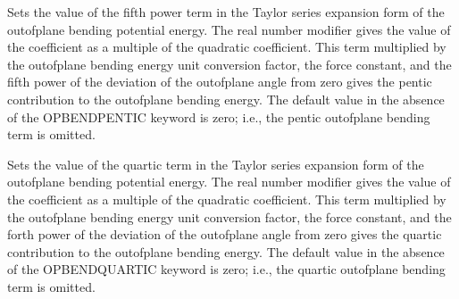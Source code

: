 \documentclass[letterpaper,11pt,english]{sphinxmanual}
\begin{document}
\ignorespaces {}\label{\detokenize{text/keywords:key-opbend-pentic}}\begin{description}
\sphinxAtStartPar
Sets the value of the fifth power term in the Taylor series expansion form of the out\sphinxhyphen{}of\sphinxhyphen{}plane bending potential energy. The real number modifier gives the value of the coefficient as a multiple of the quadratic coefficient. This term multiplied by the out\sphinxhyphen{}of\sphinxhyphen{}plane bending energy unit conversion factor, the force constant, and the fifth power of the deviation of the out\sphinxhyphen{}of\sphinxhyphen{}plane angle from zero gives the pentic contribution to the out\sphinxhyphen{}of\sphinxhyphen{}plane bending energy. The default value in the absence of the OPBEND\sphinxhyphen{}PENTIC keyword is zero; i.e., the pentic out\sphinxhyphen{}of\sphinxhyphen{}plane bending term is omitted.

\end{description}

\ignorespaces {}\label{\detokenize{text/keywords:key-opbend-quartic}}\begin{description}
\sphinxAtStartPar
Sets the value of the quartic term in the Taylor series expansion form of the out\sphinxhyphen{}of\sphinxhyphen{}plane bending potential energy. The real number modifier gives the value of the coefficient as a multiple of the quadratic coefficient. This term multiplied by the out\sphinxhyphen{}of\sphinxhyphen{}plane bending energy unit conversion factor, the force constant, and the forth power of the deviation of the out\sphinxhyphen{}of\sphinxhyphen{}plane angle from zero gives the quartic contribution to the out\sphinxhyphen{}of\sphinxhyphen{}plane bending energy. The default value in the absence of the OPBEND\sphinxhyphen{}QUARTIC keyword is zero; i.e., the quartic out\sphinxhyphen{}of\sphinxhyphen{}plane bending term is omitted.

\end{description}
\end{document}
